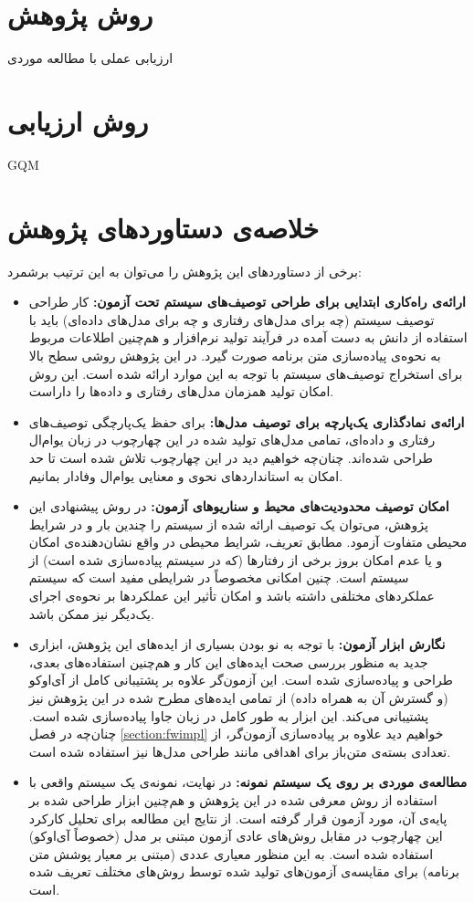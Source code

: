 \section{روش پژوهش}
ارزیابی عملی با مطالعه موردی
\section{روش ارزیابی}
GQM
\section{خلاصه‌ی دستاوردهای پژوهش}
برخی از دستاوردهای این پژوهش را می‌توان به این ترتیب برشمرد:
\begin{itemize}
\item \textbf{ارائه‌ی راه‌کاری ابتدایی برای طراحی توصیف‌های سیستم تحت آزمون:} کار طراحی توصیف سیستم (چه برای مدل‌های رفتاری و چه برای مدل‌های داده‌ای) باید با استفاده از دانش به دست آمده در فرآیند تولید نرم‌افزار و هم‌چنین اطلاعات مربوط به نحوه‌ی پیاده‌سازی متن برنامه صورت گیرد. در این پژوهش روشی سطح بالا برای استخراج توصیف‌های سیستم با توجه به این موارد ارائه شده است. این روش امکان تولید همزمان مدل‌های رفتاری و داده‌ها را داراست.

\item \textbf{ارائه‌ی نمادگذاری یک‌پارچه برای توصیف مدل‌ها:} برای حفظ یک‌پارچگی توصیف‌های رفتاری و داده‌ای، تمامی مدل‌های تولید شده در این چهارچوب در زبان یو‌ام‌ال طراحی شده‌اند. چنان‌چه خواهیم دید در این چهارچوب تلاش شده است تا حد امکان به استانداردهای نحوی و معنایی یو‌ام‌ال وفادار بمانیم.

\item \textbf{امکان توصیف محدودیت‌های محیط و سناریوهای آزمون:} در روش پیشنهادی این پژوهش، می‌توان یک توصیف ارائه شده از سیستم را چندین بار و در شرایط محیطی متفاوت آزمود. مطابق تعریف، شرایط محیطی در واقع نشان‌دهنده‌ی امکان و یا عدم امکان بروز برخی از رفتارها (که در سیستم پیاده‌سازی شده است) از سیستم است. چنین امکانی مخصوصاً در شرایطی مفید است که سیستم عملکرد‌های مختلفی داشته باشد و امکان تأثیر این عملکردها بر نحوه‌ی اجرای یک‌دیگر نیز ممکن باشد.

\item \textbf{نگارش ابزار آزمون:} با توجه به نو بودن بسیاری از ایده‌های این پژوهش، ابزاری جدید به منظور بررسی صحت ایده‌های این کار و هم‌چنین استفاده‌های بعدی، طراحی و پیاده‌سازی شده است. این آزمون‌گر علاوه بر پشتیبانی کامل از آی‌اوکو (و گسترش آن به همراه داده) از تمامی ایده‌های مطرح شده در این پژوهش نیز پشتیبانی می‌کند.  این ابزار به طور کامل در زبان جاوا پیاده‌سازی شده است. چنان‌چه در فصل \ref{section:fwimpl} خواهیم دید علاوه بر پیاده‌سازی آزمون‌گر، از تعدادی بسته‌‌ی متن‌باز برای اهدافی مانند طراحی مدل‌ها نیز استفاده شده است.

\item \textbf{مطالعه‌ی موردی بر روی یک سیستم نمونه:} در نهایت، نمونه‌ی یک سیستم واقعی با استفاده از روش معرفی شده در این پژوهش و هم‌چنین ابزار طراحی شده بر پایه‌ی آن، مورد آزمون قرار گرفته است. از نتایج این مطالعه برای تحلیل کارکرد این چهارچوب در مقابل روش‌های عادی آزمون مبتنی بر مدل (خصوصاً آی‌او‌کو) استفاده شده است. به این منظور معیاری عددی (مبتنی بر معیار پوشش متن برنامه) برای مقایسه‌ی آزمون‌های تولید شده توسط روش‌های مختلف تعریف شده است.
\end{itemize}
